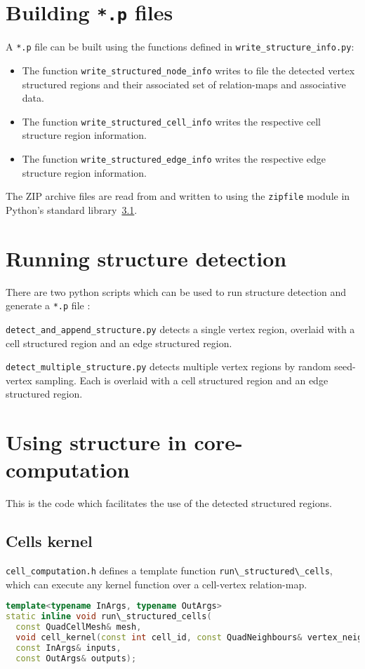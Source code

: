 \section{Building \texttt{*.p} files}
A \texttt{*.p} file can be built using the functions defined in \texttt{write\_structure\_info.py}:
\begin{itemize}
\item The function \lstinline|write_structured_node_info| writes to file the detected vertex structured regions and their associated set of relation-maps and associative data.
\item The function \lstinline|write_structured_cell_info| writes the respective cell structure region information.
\item The function \lstinline|write_structured_edge_info| writes the respective edge structure region information.
\end{itemize}

The ZIP archive files are read from and written to using the \lstinline|zipfile| module in Python's standard library~\ref{}. %


\section{Running structure detection}
There are two python scripts which can be used to run structure detection and generate a \texttt{*.p} file :
\begin{enumerate*}[label=\alph*)]
\item \texttt{detect\_and\_append\_structure.py} detects a single vertex region, overlaid with a cell structured region and an edge structured region.
\item \texttt{detect\_multiple\_structure.py} detects multiple vertex regions by random seed-vertex sampling. Each is overlaid with a cell structured region and an edge structured region.
\end{enumerate*}


\section{Using structure in core-computation}
This is the code which facilitates the use of the detected structured regions.

\subsection{Cells kernel}
\texttt{cell\_computation.h} defines a template function \lstinline|run\_structured\_cells|, which can execute any kernel function over a cell-vertex relation-map.
\begin{lstlisting}[language=c++]
template<typename InArgs, typename OutArgs>
static inline void run\_structured_cells(
  const QuadCellMesh& mesh,
  void cell_kernel(const int cell_id, const QuadNeighbours& vertex_neighbours, const QuadCellMesh&, const InArgs&, const OutArgs&),
  const InArgs& inputs,
  const OutArgs& outputs);
\end{lstlisting}

